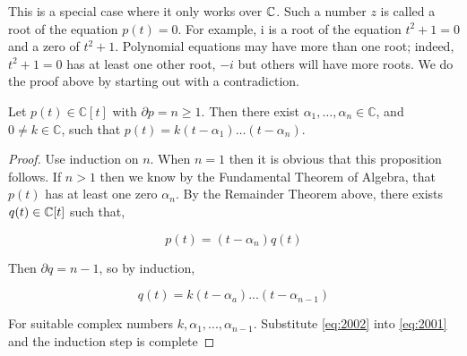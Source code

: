 This is a special case where it only works over $\mathbb C$. Such a number $z$ is called a root of the equation $p(t)=0$. For example, $\mathrm{i}$ is a root of the equation $t^2+1=0$ and a zero of $t^2+1$. Polynomial equations may have more than one root; indeed, $t^2+1=0$ has at least one other root, $-i$ but others will have more roots. We do the proof above by starting out with a contradiction.

\begin{proposition}
	Let $p(t) \in \mathbb{C}[t]$ with $\partial p=n \geq 1$. Then there exist $\alpha_1, \ldots, \alpha_n \in \mathbb{C}$, and $0 \neq k \in \mathbb{C}$, such that
	$
	p(t)=k\left(t-\alpha_1\right) \ldots\left(t-\alpha_n\right).
	$
\end{proposition}

\begin{proof}
	Use induction on $n$. When $n = 1$ then it is obvious that this proposition follows. If $n > 1$ then we know by the Fundamental Theorem of Algebra, that $p(t)$ has at least one zero $\alpha_n$. By the Remainder Theorem above, there exists $q(t) \in \mathbb C[t]$ such that,
	
	\begin{equation} \label{eq:2001}
		p(t) = (t-\alpha_n) q(t)
	\end{equation}
	
	Then $\partial q = n - 1$, so by induction,
	
	\begin{equation} \label{eq:2002}
		q(t) = k(t-\alpha_a)...(t-\alpha_{n-1})
	\end{equation}     
	
	For suitable complex numbers $k,\alpha_1,...,\alpha_{n-1}$. Substitute \ref{eq:2002} into \ref{eq:2001} and the induction step is complete
\end{proof}